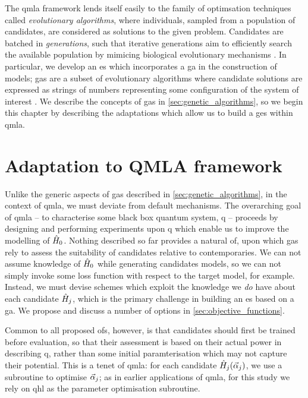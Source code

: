 \glsresetall
The \gls{qmla} framework lends itself easily to the family of optimsation techniques called \emph{evolutionary algorithms}, 
    where individuals, sampled from a population of candidates, are considered as solutions to the given problem.
Candidates are batched in \emph{generations},
    such that iterative generations aim to efficiently search the available population
    by mimicing biological evolutionary mechanisms \cite{back1996evolutionary}. 
In particular, we develop an \gls{es} which incorporates a \gls{ga} in the construction of models;
    \glspl{ga} are a subset of evolutionary algorithms where candidate solutions are expressed as 
    strings of numbers representing some configuration of the system of interest \cite{holland1992adaptation}.
We describe the concepts of \glspl{ga} in \cref{sec:genetic_algorithms}, 
    so we begin this chapter by describing the adaptations which allow us to build a \gls{ges} within \gls{qmla}. 
\par 

\section{Adaptation to QMLA framework}\label{sec:ga_adaptation_to_qmla}
Unlike the generic aspects of \glspl{ga} described in \cref{sec:genetic_algorithms}, 
    in the context of \gls{qmla}, we must deviate from default mechanisms. 
The overarching goal of \gls{qmla} --
    to characterise some black box quantum system, \gls{q} --
    proceeds by designing and performing experiments upon \gls{q} which enable us to improve 
    the modelling of $\hat{H}_0$. 
Nothing described so far provides a natural \gls{of}, upon which \glspl{ga} rely 
    to assess the suitability of candidates relative to contemporaries.
We can not assume knowledge of $\hat{H}_0$ while generating candidates \glspl{model},
    so we can not simply invoke some loss function with respect to the target model, for example. 
Instead, we must devise schemes which exploit the knowledge we \emph{do} have about each candidate $\hat{H}_j$, 
    which is the primary challenge in building an \gls{es} based on a \gls{ga}.  
We propose and discuss a number of options in \cref{sec:objective_functions}. 
\par 

Common to all proposed \glspl{of}, however, is that candidates should first be trained before evaluation, 
    so that their assessment is based on their actual power in describing \gls{q},  
    rather than some initial paramterisation which may not capture their potential. 
This is a tenet of \gls{qmla}: for each candidate $\hat{H}_j ( \vec{\alpha}_j )$, we use a subroutine to optimise $\vec{\alpha}_j$;
    as in earlier applications of \gls{qmla}, for this study we rely on \gls{qhl} as the parameter optimisation subroutine. 
\par

